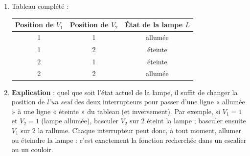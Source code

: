 \documentclass[11pt]{article}
\begin{document}
\begin{corrige}
\begin{enumerate}
\item Tableau complété :
\begin{center}
\begin{tabular}{|c|c|c|}
\hline
\rowcolor{popblueL} Position de $V_1$ & Position de $V_2$ & État de la lampe $L$ \\
\hline
1 & 1 & allumée \\
\hline
1 & 2 & éteinte \\
\hline
2 & 1 & éteinte \\
\hline
2 & 2 & allumée \\
\hline
\end{tabular}
\end{center}
\item \textbf{Explication} : quel que soit l'état actuel de la lampe, il suffit de changer la position de \emph{l'un seul} des deux interrupteurs pour passer d'une ligne « allumée » à une ligne « éteinte » du tableau (et inversement). Par exemple, si $V_1 = 1$ et $V_2 = 1$ (lampe allumée), basculer $V_2$ sur 2 éteint la lampe ; basculer ensuite $V_1$ sur 2 la rallume. Chaque interrupteur peut donc, à tout moment, allumer ou éteindre la lampe : c'est exactement la fonction recherchée dans un escalier ou un couloir.
\end{enumerate}
\end{corrige}
\end{document}
